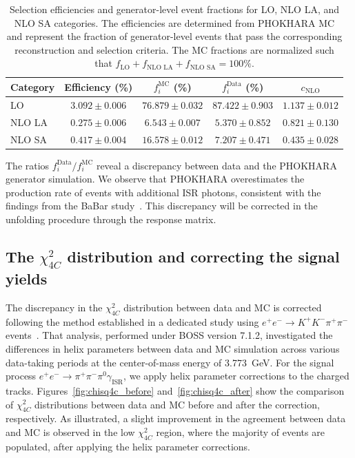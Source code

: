 \begin{table}[htbp]
    \centering
    \caption{Selection efficiencies and generator-level event fractions for LO, NLO LA, and NLO SA categories. The efficiencies are determined from PHOKHARA MC and represent the fraction of generator-level events that pass the corresponding reconstruction and selection criteria. The MC fractions are normalized such that $f_{\text{LO}} + f_{\text{NLO LA}} + f_{\text{NLO SA}} = 100\%$.}
    \vspace{4mm}
    \begin{tabular}{lcccc}
        \hline
        Category & Efficiency (\%)   & $f_i^{\text{MC}}$ (\%) & $f_i^{\text{Data}}$ (\%) & $c_{\text{NLO}}$          \\
        \hline
        LO       & $3.092 \pm 0.006$ & $76.879 \pm 0.032$     & $87.422 \pm 0.903$       & $1.137 \pm 0.012$ \\
        NLO LA   & $0.275 \pm 0.006$ & $6.543 \pm 0.007$      & $5.370 \pm 0.852$        & $0.821 \pm 0.130$ \\
        NLO SA   & $0.417 \pm 0.004$ & $16.578 \pm 0.012$     & $7.207 \pm 0.471$        & $0.435 \pm 0.028$ \\
        \hline
    \end{tabular}

    \label{tab:nlo_fraction}
\end{table}
The ratios $f_i^{\text{Data}} / f_i^{\text{MC}}$ reveal a discrepancy between data and the PHOKHARA generator simulation. We observe that PHOKHARA overestimates the production rate of events with additional ISR photons, consistent with the findings from the BaBar study~\cite{PhysRevD.108.L111103}. This discrepancy will be corrected in the unfolding procedure through the response matrix.


\subsection{The $\chi^2_{4C}$ distribution and correcting the signal yields}
\label{sec:corr_signal_kmfit}
The discrepancy in the $\chi^2_{4C}$ distribution between data and MC is corrected following the method established in a dedicated study using $e^+e^- \to K^+K^-\pi^+\pi^-$ events~\cite{BESIII_chisq4C_correction_2025}. That analysis, performed under BOSS version 7.1.2, investigated the differences in helix parameters between data and MC simulation across various data-taking periods at the center-of-mass energy of 3.773~GeV. For the signal process $e^+e^- \to \pi^+\pi^-\pi^0\gamma_{\text{ISR}}$, we apply helix parameter corrections to the charged tracks. Figures~\ref{fig:chisq4c_before} and~\ref{fig:chisq4c_after} show the comparison of $\chi^2_{4C}$ distributions between data and MC before and after the correction, respectively. As illustrated, a slight improvement in the agreement between data and MC is observed in the low $\chi^2_{4C}$ region, where the majority of events are populated, after applying the helix parameter corrections. 

